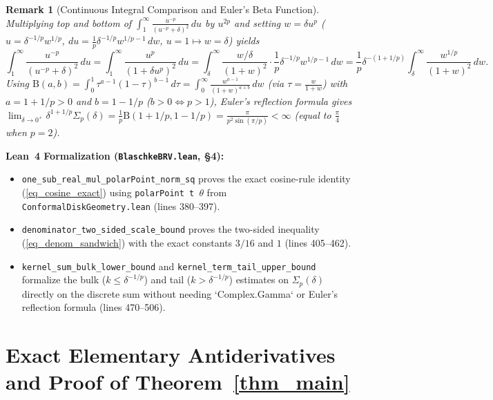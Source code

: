 \documentclass[11pt,reqno]{amsart}
\newtheorem{rem}[thm]{Remark}
\numberwithin{equation}{section}
\begin{document}
\begin{rem}[Continuous Integral Comparison and Euler's Beta Function] \label{rem_beta_integral}
\normalfont
Multiplying top and bottom of $\int_1^\infty \frac{u^{-p}}{(u^{-p} + \delta)^2}\,du$ by $u^{2p}$ and setting $w = \delta u^p$ ($u = \delta^{-1/p} w^{1/p}$, $du = \frac{1}{p}\delta^{-1/p} w^{1/p - 1}\,dw$, $u = 1 \mapsto w = \delta$) yields
\[
  \int_1^\infty \frac{u^{-p}}{(u^{-p} + \delta)^2}\,du
  = \int_1^\infty \frac{u^p}{(1 + \delta u^p)^2}\,du
  = \int_\delta^\infty \frac{w/\delta}{(1 + w)^2} \cdot \frac{1}{p}\delta^{-1/p} w^{1/p - 1}\,dw
  = \frac{1}{p}\delta^{-(1 + 1/p)} \int_\delta^\infty \frac{w^{1/p}}{(1 + w)^2}\,dw.
\]
Using $\mathrm{B}(a, b) = \int_0^1 \tau^{a-1}(1 - \tau)^{b-1}\,d\tau = \int_0^\infty \frac{w^{a-1}}{(1 + w)^{a + b}}\,dw$ (via $\tau = \frac{w}{1 + w}$) with $a = 1 + 1/p > 0$ and $b = 1 - 1/p$ ($b > 0 \iff p > 1$), Euler's reflection formula gives $\lim_{\delta \to 0^+} \delta^{1 + 1/p}\Sigma_p(\delta) = \frac{1}{p}\mathrm{B}(1 + 1/p, 1 - 1/p) = \frac{\pi}{p^2 \sin(\pi/p)} < \infty$ (equal to $\frac{\pi}{4}$ when $p = 2$).
\end{rem}

\begin{leveltwo}
\noindent\textbf{\textcolor{leannote}{Lean~4 Formalization (\texttt{BlaschkeBRV.lean}, \S 4):}}
\begin{itemize}
\item \texttt{one\_sub\_real\_mul\_polarPoint\_norm\_sq} proves the exact cosine-rule identity (\ref{eq_cosine_exact}) using \texttt{polarPoint t $\theta$} from \texttt{ConformalDiskGeometry.lean} (lines 380--397).
\item \texttt{denominator\_two\_sided\_scale\_bound} proves the two-sided inequality (\ref{eq_denom_sandwich}) with the exact constants $3/16$ and $1$ (lines 405--462).
\item \texttt{kernel\_sum\_bulk\_lower\_bound} and \texttt{kernel\_term\_tail\_upper\_bound} formalize the bulk ($k \le \delta^{-1/p}$) and tail ($k > \delta^{-1/p}$) estimates on $\Sigma_p(\delta)$ directly on the discrete sum without needing `Complex.Gamma` or Euler's reflection formula (lines 470--506).
\end{itemize}
\end{leveltwo}

\section{Exact Elementary Antiderivatives and Proof of Theorem~\ref{thm_main}} \label{sec_two_zone}
\end{document}
